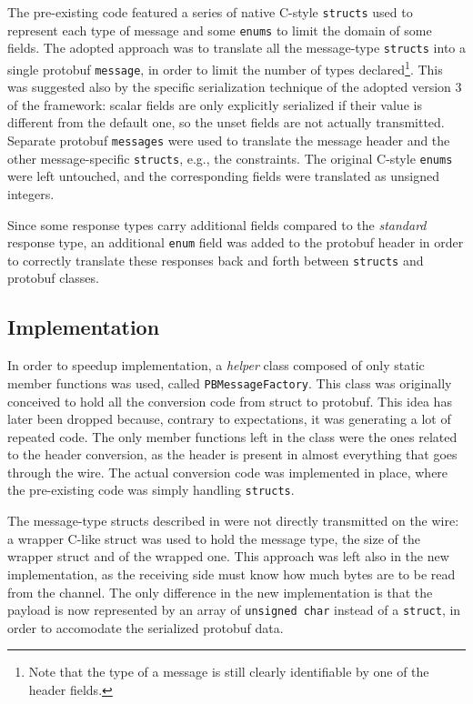 The pre-existing code featured a series of native C-style \texttt{structs} used to represent each type of message and some \texttt{enums} to limit the domain of some fields. The adopted approach was to translate all the message-type \texttt{structs} into a single protobuf \texttt{message}, in order to limit the number of types declared\footnote{Note that the type of a message is still clearly identifiable by one of the header fields.}. This was suggested also by the specific serialization technique of the adopted version 3 of the framework: scalar fields are only explicitly serialized if their value is different from the default one, so the unset fields are not actually transmitted. Separate protobuf \texttt{messages} were used to translate the message header and the other message-specific \texttt{structs}, e.g.,  the constraints. The original C-style \texttt{enums} were left untouched, and the corresponding fields were translated as unsigned integers.

Since some response types carry additional fields compared to the \emph{standard} response type, an additional \texttt{enum} field was added to the protobuf header in order to correctly translate these responses back and forth between \texttt{structs} and protobuf classes.

\subsection{Implementation}

In order to speedup implementation, a \emph{helper} class composed of only static member functions was used, called \texttt{PBMessageFactory}. This class was originally conceived to hold all the conversion code from struct to protobuf. This idea has later been dropped because, contrary to expectations, it was generating a lot of repeated code. The only member functions left in the class were the ones related to the header conversion, as the header is present in almost everything that goes through the wire. The actual conversion code was implemented in place, where the pre-existing code was simply handling \texttt{structs}.

The message-type structs described in  were not directly transmitted on the wire: a wrapper C-like struct was used to hold the message type, the size of the wrapper struct and of the wrapped one. This approach was left also in the new implementation, as the receiving side must know how much bytes are to be read from the channel. The only difference in the new implementation is that the payload is now represented by an array of \texttt{unsigned char} instead of a \texttt{struct}, in order to accomodate the serialized protobuf data.

